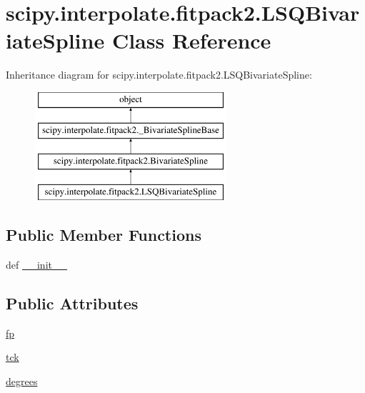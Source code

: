 \hypertarget{classscipy_1_1interpolate_1_1fitpack2_1_1LSQBivariateSpline}{}\section{scipy.\+interpolate.\+fitpack2.\+L\+S\+Q\+Bivariate\+Spline Class Reference}
\label{classscipy_1_1interpolate_1_1fitpack2_1_1LSQBivariateSpline}
Inheritance diagram for scipy.\+interpolate.\+fitpack2.\+L\+S\+Q\+Bivariate\+Spline\+:\begin{figure}[H]
\begin{center}
\leavevmode
\includegraphics[height=4.000000cm]{classscipy_1_1interpolate_1_1fitpack2_1_1LSQBivariateSpline}
\end{center}
\end{figure}
\subsection*{Public Member Functions}
\begin{DoxyCompactItemize}
\item 
def \hyperlink{classscipy_1_1interpolate_1_1fitpack2_1_1LSQBivariateSpline_a66351f8e7826a1bbcec1b9901bcd5e7f}{\+\_\+\+\_\+init\+\_\+\+\_\+}
\end{DoxyCompactItemize}
\subsection*{Public Attributes}
\begin{DoxyCompactItemize}
\item 
\hyperlink{classscipy_1_1interpolate_1_1fitpack2_1_1LSQBivariateSpline_a22d30295a3687461ff4ba6aa58f3d798}{fp}
\item 
\hyperlink{classscipy_1_1interpolate_1_1fitpack2_1_1LSQBivariateSpline_aaed5d976271ef387e4b3c8dcc8db84ef}{tck}
\item 
\hyperlink{classscipy_1_1interpolate_1_1fitpack2_1_1LSQBivariateSpline_af89701808c194d7ab30dfc4206409b7e}{degrees}
\end{DoxyCompactItemize}


